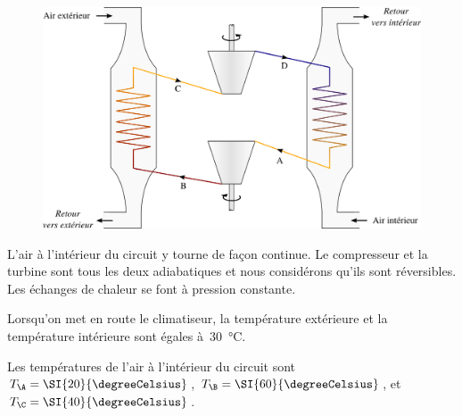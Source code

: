 	\begin{figure}
		\begin{center}
		\includegraphics[width=\textwidth]{images/aircon_pack.png}
		\end{center}
		\label{fig_exo_climatiseur}
	\end{figure}
	
	L’air à l’intérieur du circuit y tourne de façon continue. Le compresseur et la turbine sont tous les deux adiabatiques et nous considérons qu’ils sont réversibles. Les échanges de chaleur se font à pression constante.

	Lorsqu’on met en route le climatiseur, la température extérieure et la température intérieure sont égales à~\SI{30}{\degreeCelsius}.
 
	Les températures de l’air à l’intérieur du circuit sont $T_\A = \SI{20}{\degreeCelsius}$, $T_\B = \SI{60}{\degreeCelsius}$, et $T_\C = \SI{40}{\degreeCelsius}$.

